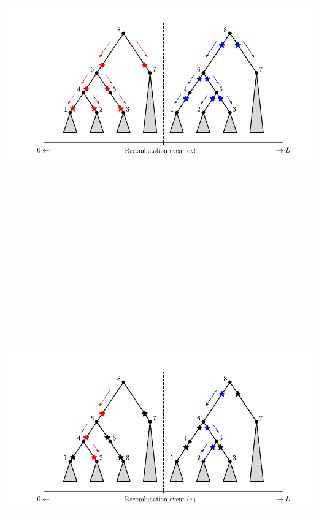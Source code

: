 \documentclass[
  letterpaper,
  DIV=11,
  numbers=noendperiod]{scrartcl}
\begin{document}
\begin{center}
\includegraphics[width=\linewidth,height=5.72917in,keepaspectratio]{slides_files/mediabag/imgs/two-trees-naive.pdf}
\end{center}

\begin{center}
\includegraphics[width=\linewidth,height=5.72917in,keepaspectratio]{slides_files/mediabag/imgs/two-trees-efficient.pdf}
\end{center}
\end{document}
